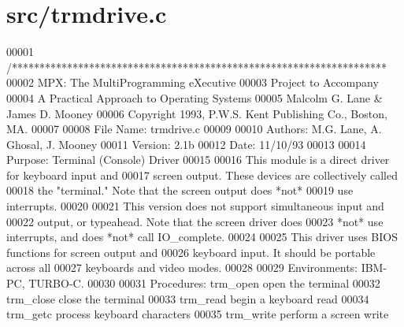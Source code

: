\hypertarget{trmdrive_8c_source}{
\section{src/trmdrive.c}
}

\begin{DoxyCode}
00001 \textcolor{comment}{/********************************************************************}
00002 \textcolor{comment}{        MPX: The MultiProgramming eXecutive}
00003 \textcolor{comment}{        Project to Accompany}
00004 \textcolor{comment}{        A Practical Approach to Operating Systems}
00005 \textcolor{comment}{        Malcolm G. Lane & James D. Mooney}
00006 \textcolor{comment}{        Copyright 1993, P.W.S. Kent Publishing Co., Boston, MA.}
00007 \textcolor{comment}{        }
00008 \textcolor{comment}{        File Name: trmdrive.c}
00009 \textcolor{comment}{}
00010 \textcolor{comment}{        Authors: M.G. Lane, A. Ghosal, J. Mooney}
00011 \textcolor{comment}{        Version: 2.1b}
00012 \textcolor{comment}{        Date: 11/10/93}
00013 \textcolor{comment}{}
00014 \textcolor{comment}{        Purpose: Terminal (Console) Driver}
00015 \textcolor{comment}{}
00016 \textcolor{comment}{        This module is a direct driver for keyboard input and}
00017 \textcolor{comment}{        screen output.  These devices are collectively called}
00018 \textcolor{comment}{        the "terminal."  Note that the screen output does *not*}
00019 \textcolor{comment}{        use interrupts.}
00020 \textcolor{comment}{}
00021 \textcolor{comment}{        This version does not support simultaneous input and}
00022 \textcolor{comment}{        output, or typeahead.  Note that the screen driver does}
00023 \textcolor{comment}{        *not* use interrupts, and does *not* call IO\_complete.}
00024 \textcolor{comment}{}
00025 \textcolor{comment}{        This driver uses BIOS functions for screen output and}
00026 \textcolor{comment}{        keyboard input.  It should be portable across all}
00027 \textcolor{comment}{        keyboards and video modes.}
00028 \textcolor{comment}{}
00029 \textcolor{comment}{        Environments: IBM-PC, TURBO-C.}
00030 \textcolor{comment}{                }
00031 \textcolor{comment}{        Procedures:     trm\_open        open the terminal}
00032 \textcolor{comment}{                        trm\_close       close the terminal}
00033 \textcolor{comment}{                        trm\_read        begin a keyboard read}
00034 \textcolor{comment}{                        trm\_getc        process keyboard characters}
00035 \textcolor{comment}{                        trm\_write       perform a screen write}

\end{DoxyCode}
